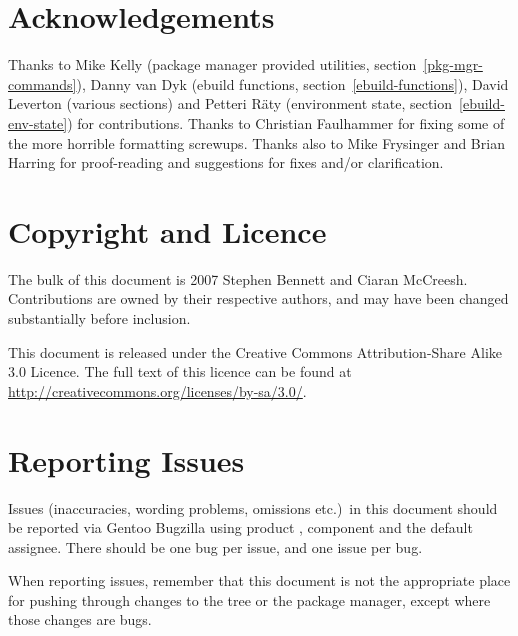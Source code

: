 \section*{Acknowledgements}

Thanks to Mike Kelly (package manager provided utilities, section~\ref{pkg-mgr-commands}), Danny van
Dyk (ebuild functions, section~\ref{ebuild-functions}), David Leverton (various sections) and
Petteri Räty (environment state, section~\ref{ebuild-env-state}) for contributions. Thanks to
Christian Faulhammer for fixing some of the more horrible formatting screwups. Thanks also to Mike
Frysinger and Brian Harring for proof-reading and suggestions for fixes and/or clarification.

\section*{Copyright and Licence}

The bulk of this document is \textcopyright{} 2007 Stephen Bennett and Ciaran McCreesh. Contributions
are owned by their respective authors, and may have been changed substantially before inclusion.

This document is released under the Creative Commons Attribution-Share Alike 3.0 Licence. The full
text of this licence can be found at \url{http://creativecommons.org/licenses/by-sa/3.0/}.

\section*{Reporting Issues}

Issues (inaccuracies, wording problems, omissions etc.)\ in this document should be reported via
Gentoo Bugzilla using product , component  and the default
assignee. There should be one bug per issue, and one issue per bug.

When reporting issues, remember that this document is not the appropriate place for pushing
through changes to the tree or the package manager, except where those changes are bugs.



